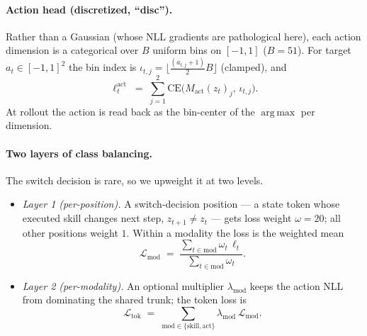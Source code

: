 \documentclass[11pt]{article}
\newcommand{\skill}{z}
\newcommand{\argmax}{\operatorname*{arg\,max}}
\begin{document}
\paragraph{Action head (discretized, ``disc'').}
Rather than a Gaussian (whose NLL gradients are pathological here), each action
dimension is a categorical over $B$ uniform bins on $[-1,1]$ ($B=51$). For target
$a_t\in[-1,1]^{2}$ the bin index is
$\iota_{t,j}=\big\lfloor \tfrac{(a_{t,j}+1)}{2}B\big\rfloor$ (clamped), and
\begin{equation}
\ell^{\mathrm{act}}_t \;=\; \sum_{j=1}^{2}
\mathrm{CE}\big(M_{\mathrm{act}}(\skill_t)_{j},\,\iota_{t,j}\big).
\end{equation}
At rollout the action is read back as the bin-center of the $\argmax$ per dimension.

\paragraph{Two layers of class balancing.}
The switch decision is rare, so we upweight it at two levels.
\begin{itemize}
\item \emph{Layer 1 (per-position).} A switch-decision position --- a state token whose
executed skill changes next step, $\skill_{t+1}\neq\skill_t$ --- gets loss weight
$\omega=20$; all other positions weight $1$. Within a modality the loss is the
weighted mean
\begin{equation}
\mathcal{L}_{\text{mod}} \;=\;
\frac{\sum_{t\in\text{mod}} \omega_t\,\ell_t}{\sum_{t\in\text{mod}} \omega_t}.
\end{equation}
\item \emph{Layer 2 (per-modality).} An optional multiplier $\lambda_{\text{mod}}$
keeps the action NLL from dominating the shared trunk; the token loss is
\begin{equation}
\mathcal{L}_{\mathrm{tok}} \;=\; \sum_{\text{mod}\in\{\text{skill},\text{act}\}}
\lambda_{\text{mod}}\,\mathcal{L}_{\text{mod}}.
\end{equation}
\end{itemize}
\end{document}
